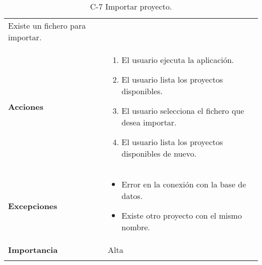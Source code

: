 \begin{longtable}[H]{@{}ll@{}}
\begin{minipage}[t]{0.71\columnwidth}
Existe un fichero para importar.
\strut
\end{minipage}\tabularnewline
\begin{minipage}[t]{0.23\columnwidth}\raggedright\strut
\textbf{Acciones}\strut
\end{minipage} & \begin{minipage}[t]{0.71\columnwidth}\raggedright\strut
\begin{enumerate}
\def\labelenumi{\arabic{enumi}.}
\item
El usuario ejecuta la aplicación.
\item
El usuario lista los proyectos disponibles.
\item
El usuario selecciona el fichero que desea importar.
\item
El usuario lista los proyectos disponibles de nuevo.
\end{enumerate}\strut
\end{minipage}\tabularnewline
\begin{minipage}[t]{0.23\columnwidth}\raggedright\strut
\textbf{Excepciones}\strut
\end{minipage} & \begin{minipage}[t]{0.71\columnwidth}\raggedright\strut
\begin{itemize}
\item
Error en la conexión con la base de datos.
\item
Existe otro proyecto con el mismo nombre.
\end{itemize}\strut
\end{minipage}\tabularnewline
\begin{minipage}[t]{0.23\columnwidth}\raggedright\strut
\textbf{Importancia}\strut
\end{minipage} & \begin{minipage}[t]{0.71\columnwidth}\raggedright\strut
Alta\strut
\end{minipage}\tabularnewline
\bottomrule
\caption{C-7 Importar proyecto.}
\end{longtable}

